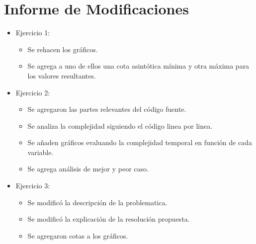 \section{Informe de Modificaciones}

\begin{itemize}

	\item Ejercicio 1:
	\begin{itemize}
		\item Se rehacen los gráficos.
		\item Se agrega a uno de ellos una cota asintótica mínima y otra máxima para los valores resultantes.
	\end{itemize}
	
	\item Ejercicio 2:
	\begin{itemize}
		\item Se agregaron las partes relevantes del código fuente.
		\item Se analiza la complejidad siguiendo el código linea por linea.
		\item Se a\~naden gráficos evaluando la complejidad temporal en función de cada variable.
		\item Se agrega análisis de mejor y peor caso.
	\end{itemize}
	
	\item Ejercicio 3:
	\begin{itemize}
		\item Se modificó la descripción de la problematica.
		\item Se modificó la explicación de la resolución propuesta.
		\item Se agregaron cotas a los gráficos.
	\end{itemize}
\end{itemize}